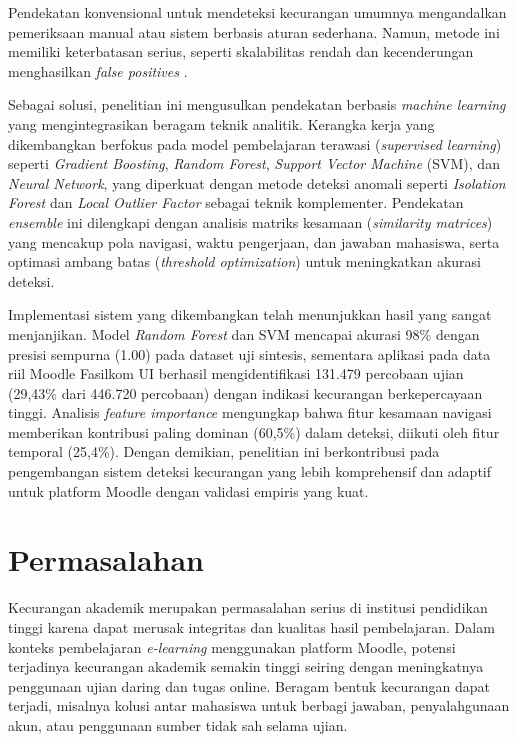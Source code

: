 Pendekatan konvensional untuk mendeteksi kecurangan umumnya mengandalkan pemeriksaan manual atau sistem berbasis aturan sederhana. Namun, metode ini memiliki keterbatasan serius, seperti skalabilitas rendah dan kecenderungan menghasilkan \textit{false positives} \cite{MorenoMarcos2023}. 

Sebagai solusi, penelitian ini mengusulkan pendekatan berbasis \textit{machine learning} yang mengintegrasikan beragam teknik analitik. Kerangka kerja yang dikembangkan berfokus pada model pembelajaran terawasi (\textit{supervised learning}) seperti \textit{Gradient Boosting}, \textit{Random Forest}, \textit{Support Vector Machine} (SVM), dan \textit{Neural Network}, yang diperkuat dengan metode deteksi anomali seperti \textit{Isolation Forest} dan \textit{Local Outlier Factor} sebagai teknik komplementer. Pendekatan \textit{ensemble} ini dilengkapi dengan analisis matriks kesamaan (\textit{similarity matrices}) yang mencakup pola navigasi, waktu pengerjaan, dan jawaban mahasiswa, serta optimasi ambang batas (\textit{threshold optimization}) untuk meningkatkan akurasi deteksi.

Implementasi sistem yang dikembangkan telah menunjukkan hasil yang sangat menjanjikan. Model \textit{Random Forest} dan SVM mencapai akurasi 98\% dengan presisi sempurna (1.00) pada dataset uji sintesis, sementara aplikasi pada data riil Moodle Fasilkom UI berhasil mengidentifikasi 131.479 percobaan ujian (29,43\% dari 446.720 percobaan) dengan indikasi kecurangan berkepercayaan tinggi. Analisis \textit{feature importance} mengungkap bahwa fitur kesamaan navigasi memberikan kontribusi paling dominan (60,5\%) dalam deteksi, diikuti oleh fitur temporal (25,4\%). Dengan demikian, penelitian ini berkontribusi pada pengembangan sistem deteksi kecurangan yang lebih komprehensif dan adaptif untuk platform Moodle dengan validasi empiris yang kuat.

\section{Permasalahan}
\label{sec:masalah}

Kecurangan akademik merupakan permasalahan serius di institusi pendidikan tinggi karena dapat merusak integritas dan kualitas hasil pembelajaran. Dalam konteks pembelajaran \textit{e-learning} menggunakan platform Moodle, potensi terjadinya kecurangan akademik semakin tinggi seiring dengan meningkatnya penggunaan ujian daring dan tugas online. Beragam bentuk kecurangan dapat terjadi, misalnya kolusi antar mahasiswa untuk berbagi jawaban, penyalahgunaan akun, atau penggunaan sumber tidak sah selama ujian.

